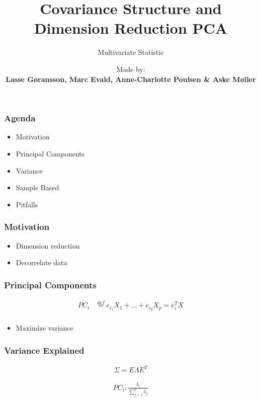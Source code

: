 \documentclass[aspectratio=169,10pt,t]{beamer}
\title{Covariance Structure and Dimension Reduction PCA}
\subtitle{Multivariate Statistic}
\date{ }
\author{
	Made by: \\
	\textbf{Lasse Gøransson, Marc Evald, Anne-Charlotte Poulsen \& Aske Møller}
}
\institute[
  SDU Robotics\\
  The Maersk Mc-Kinney Moller Institute\\
  University of Southern Denmark
] %
{%
  SDU Robotics\\
  The Maersk Mc-Kinney Moller Institute\\
  University of Southern Denmark

}
\begin{document}
{\SDUwavesbg%
\begin{frame} %
  \titlepage
\end{frame}}

\begin{frame}[t]
    \frametitle{Agenda}
    \begin{itemize}
        \item Motivation
        \item Principal Components
        \item Variance
        \item Sample Based
        \item Pitfalls
    \end{itemize}

\end{frame}

\begin{frame}[t]
	\frametitle{Motivation}

    \begin{itemize}
        \item Dimension reduction
        \item Decorrelate data
    \end{itemize}

\end{frame}

\begin{frame}[t]
    \frametitle{Principal Components}
    
    \begin{align*}
        PC_i &\overset{def}{=} e_i_1 X_1 + \hdots + e_i_p X_p = e_i^T X\\
    \end{align*}

    \pause

    \begin{itemize}
        \item Maximize variance
    \end{itemize}
\end{frame}

\begin{frame}[t]
    \frametitle{Variance Explained}
    
    \begin{align*}
    \Sigma =  E\Lambda E^T
    \end{align*}

    \begin{align*}
    PC_i: \frac{\lambda_i}{ \sum^{p}_{j=1} \lambda_j  }
    \end{align*}
    
    
\end{frame}
\end{document}

